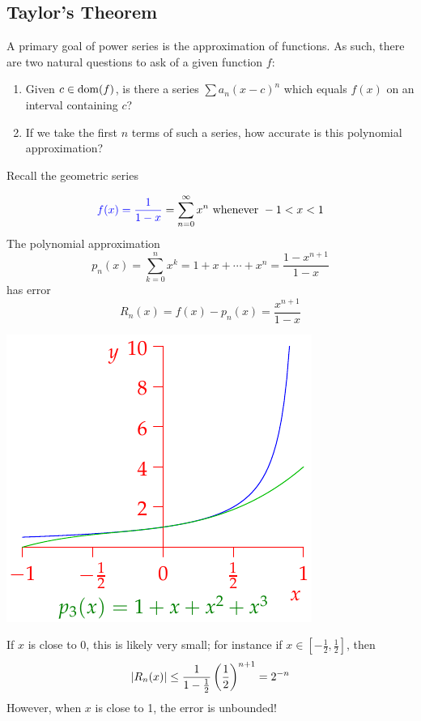 \subsection{Taylor's Theorem}

A primary goal of power series is the approximation of functions. As such, there are two natural questions to ask of a given function $f$:\vspace{-8pt}
\begin{enumerate}\itemsep0pt
  \item\label{taylormotiv} Given $c\in\operatorname{dom}(f)$, is there a series $\sum a_n(x-c)^n$ which equals $f(x)$ on an interval containing $c$?
  \item If we take the first $n$ terms of such a series, how accurate is this polynomial approximation?
\end{enumerate}

\begin{example}{}{}
Recall the geometric series\smallbreak
\begin{minipage}[t]{0.59\linewidth}\vspace{-12pt}
\[\textcolor{blue}{f(x)=\frac 1{1-x}}=\sum_{n=0}^\infty x^n\text{ whenever }-1<x<1\]
The polynomial approximation
\[p_n(x)=\sum_{k=0}^nx^k=1+x+\cdots+x^n =\frac{1-x^{n+1}}{1-x}\]
has error
\[R_n(x)=f(x)-p_n(x)=\frac{x^{n+1}}{1-x}\]
\end{minipage}
\begin{minipage}[t]{0.4\linewidth}\vspace{-20pt}
\flushright\includegraphics{taylor-remainder}
\end{minipage}\medbreak
If $x$ is close to 0, this is likely very small; for instance if $x\in\left[-\frac 12,\frac 12\right]$, then
\[\left| R_n(x)\right|\le\frac 1{1-\frac 12}\left(\frac 12\right)^{n+1}=2^{-n}\]
However, when $x$ is close to 1, the error is unbounded!
\end{example}

